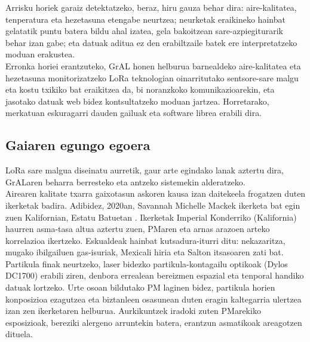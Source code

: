 \documentclass[10pt]{article}
\begin{document}
Arrisku horiek garaiz detektatzeko, beraz, hiru gauza behar dira: aire-kalitatea, tenperatura eta hezetasuna etengabe neurtzea; neurketak eraikineko hainbat gelatatik puntu batera bildu ahal izatea, gela bakoitzean sare-azpiegiturarik behar izan gabe; eta datuak aditua ez den erabiltzaile batek ere interpretatzeko moduan erakustea.\\

Erronka horiei erantzuteko, \ac{GrAL} honen helburua barnealdeko aire-kalitatea eta hezetasuna monitorizatzeko \ac{LoRa} teknologian oinarritutako sentsore-sare malgu eta kostu txikiko bat eraikitzea da, bi noranzkoko komunikazioarekin, eta jasotako datuak web bidez kontsultatzeko moduan jartzea. Horretarako, merkatuan eskuragarri dauden gailuak eta software librea erabili dira.\\

\subsection{Gaiaren egungo egoera}
\label{sec:egoera}

\ac{LoRa} sare malgua diseinatu aurretik, gaur arte egindako lanak aztertu dira, \ac{GrAL}aren beharra berresteko eta antzeko sistemekin alderatzeko.\\

Airearen kalitate txarra gaixotasun askoren kausa izan daitekeela frogatzen duten ikerketak badira. Adibidez, 2020an, Savannah Michelle Mackek ikerketa bat egin zuen Kalifornian, Estatu Batuetan \cite{mack2020air}. Ikerketak Imperial Konderriko (Kalifornia) haurren asma-tasa altua aztertu zuen, \ac{PM}aren eta arnas arazoen arteko korrelazioa ikertzeko. Eskualdeak hainbat kutsadura-iturri ditu: nekazaritza, mugako ibilgailuen gas-isuriak, Mexicali hiria eta Salton itsasoaren zati bat. Partikula finak neurtzeko, laser bidezko partikula-kontagailu optikoak (Dylos DC1700) erabili ziren, denbora errealean bereizmen espazial eta tenporal handiko datuak lortzeko. Urte osoan bildutako \ac{PM} laginen bidez, partikula horien konposizioa ezagutzea eta biztanleen osasunean duten eragin kaltegarria ulertzea izan zen ikerketaren helburua. Aurkikuntzek iradoki zuten \ac{PM}arekiko esposizioak, bereziki alergeno arruntekin batera, erantzun asmatikoak areagotzen dituela.\\
\end{document}
